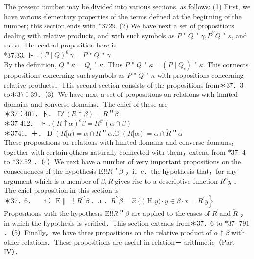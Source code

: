 \documentclass[10pt]{article}
\begin{document}
The present number may be divided into various sections, as follows: (1) First, we have various elementary properties of the terms defined at the beginning of the number; this section ends with $* 3729$. (2) We have next a set of propositions dealing with relative products, and with such symbols as $P$ " $Q$ " $\gamma, P^{\prime \prime} Q$ " $\kappa$, and so on. The central proposition here is\\
*37:33. ト $.(P \mid Q)^{6 \prime} \gamma=P$ " $Q$ " $\gamma$\\
By the definition, $Q$ " $\kappa=Q_{\epsilon}$ " $\kappa$. Thus $P$ " $Q$ " $\kappa=\left(P \mid Q_{\epsilon}\right)$ " $\kappa$. This connects propositions concerning such symbols as $P$ " $Q$ " $\kappa$ with propositions concerning\\
relative products．This second section consists of the propositions from＊37．3 to＊37：39．（3）We have next a set of propositions on relations with limited domains and converse domains．The chief of these are\\
＊37：401．ト． $\mathrm{D}^{c}(R \uparrow \beta)=R$＂$\beta$\\
＊37 412． ト $.(R \uparrow \alpha)^{c} \beta=R^{c \prime}(\alpha \cap \beta)$\\
＊3741．＋． $\mathrm{D}^{\prime}\left(R[\alpha)=\alpha \cap R\right.$＂$\alpha . \mathrm{G}^{\prime}(R[\alpha)=\alpha \cap \breve{R}$＂$\alpha$\\
These propositions on relations with limited domains and converse domains， together with certain others naturally connected with them，extend from $* 37 \cdot 4$ to $* 37.52$ ．（4）We next have a number of very important propositions on the consequences of the hypothesis $\mathrm{E}!!R$＂$\beta$ ，i．e．the hypothesis that，for any argument which is a member of $\beta, R$ gives rise to a descriptive function $R^{6} y$ ． The chief proposition in this section is\\
＊37．6．$\quad$ t： $\mathrm{E} \|$ ！$R^{\prime \prime} \beta$ ．ɔ ．$R^{\prime \prime} \beta=\widehat{x}\left\{(\right.$ H $\left.y) \cdot y \in \beta \cdot x=R^{\prime} y\right\}$\\
Propositions with the hypothesis $\mathrm{E}!!R$＂$\beta$ are applied to the cases of $\vec{R}$ and $\overleftarrow{R}$ ，in which the hypothesis is verified．This section extends from＊37．6 to $* 37 \cdot 791$ ．（5）Finally，we have three propositions on the relative product of $\alpha \uparrow \beta$ with other relations．These propositions are useful in relation－ arithmetic（Part IV）．
\end{document}
